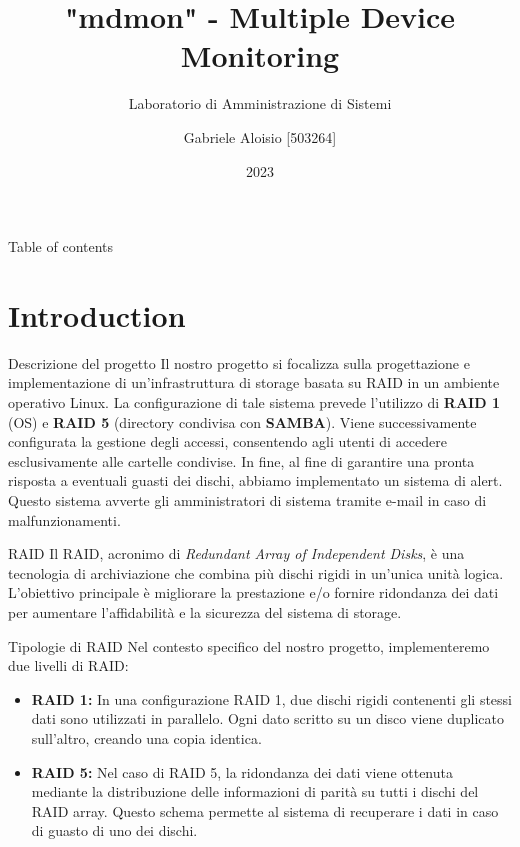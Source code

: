 \documentclass{beamer}
\title{"mdmon" - Multiple Device Monitoring}
\subtitle{Laboratorio di Amministrazione di Sistemi}
\author{Gabriele Aloisio [503264]}
\institute{Università degli studi di Messina}
\date{2023}
\begin{document}
\maketitle

\begin{frame}{Table of contents}
    \tableofcontents
\end{frame}

\section{Introduction}
\begin{frame}{Descrizione del progetto}
    Il nostro progetto si focalizza sulla progettazione e implementazione di un'infrastruttura di storage basata su RAID in un ambiente operativo Linux. La configurazione di tale sistema prevede l'utilizzo di \textbf{RAID 1} (OS) e \textbf{RAID 5} (directory condivisa con \textbf{SAMBA}). Viene successivamente configurata la gestione degli accessi, consentendo agli utenti di accedere esclusivamente alle cartelle condivise. In fine, al fine di garantire una pronta risposta a eventuali guasti dei dischi, abbiamo implementato un sistema di alert. Questo sistema avverte gli amministratori di sistema tramite e-mail in caso di malfunzionamenti.
\end{frame}

\begin{frame}{RAID}
    Il RAID, acronimo di \textit{Redundant Array of Independent Disks}, è una tecnologia di archiviazione che combina più dischi rigidi in un'unica unità logica. L'obiettivo principale è migliorare la prestazione e/o fornire ridondanza dei dati per aumentare l'affidabilità e la sicurezza del sistema di storage.
\end{frame}

\begin{frame}{Tipologie di RAID}
    Nel contesto specifico del nostro progetto, implementeremo due livelli di RAID:

    \begin{itemize}
        \item \textbf{RAID 1:} In una configurazione RAID 1, due dischi rigidi contenenti gli stessi dati sono utilizzati in parallelo. Ogni dato scritto su un disco viene duplicato sull'altro, creando una copia identica.

        \item \textbf{RAID 5:} Nel caso di RAID 5, la ridondanza dei dati viene ottenuta mediante la distribuzione delle informazioni di parità su tutti i dischi del RAID array. Questo schema permette al sistema di recuperare i dati in caso di guasto di uno dei dischi.
    \end{itemize}
\end{frame}
\end{document}
